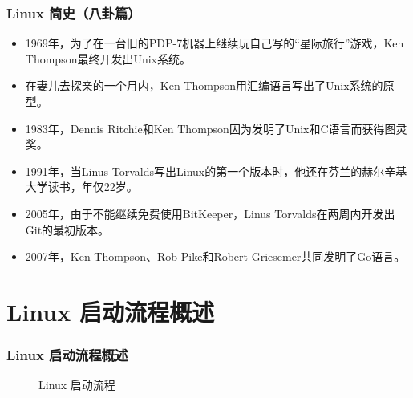 \documentclass{beamer}
\begin{document}
\begin{frame}
    \frametitle{Linux 简史（八卦篇）}

    \footnotesize
    \begin{itemize}
        \item 1969年，为了在一台旧的PDP-7机器上继续玩自己写的“星际旅行”游戏，Ken Thompson最终开发出Unix系统。
        \item 在妻儿去探亲的一个月内，Ken Thompson用汇编语言写出了Unix系统的原型。
        \item 1983年，Dennis Ritchie和Ken Thompson因为发明了Unix和C语言而获得图灵奖。
        \item 1991年，当Linus Torvalds写出Linux的第一个版本时，他还在芬兰的赫尔辛基大学读书，年仅22岁。
        \item 2005年，由于不能继续免费使用BitKeeper，Linus Torvalds在两周内开发出Git的最初版本。
        \item 2007年，Ken Thompson、Rob Pike和Robert Griesemer共同发明了Go语言。
    \end{itemize}
\end{frame}

\section{Linux 启动流程概述}

\begin{frame}
    \frametitle{Linux 启动流程概述}
    \begin{figure}
    \centering
    \caption{Linux 启动流程}
    \end{figure}
\end{frame}
\end{document}
